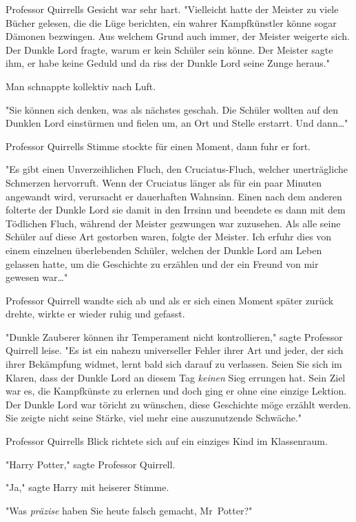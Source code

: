 {Professor Quirrells Gesicht war sehr hart. "Vielleicht hatte der Meister zu viele Bücher gelesen, die die Lüge berichten, ein wahrer Kampfkünstler könne sogar Dämonen bezwingen. Aus welchem Grund auch immer, der Meister weigerte sich. Der Dunkle Lord fragte, warum er kein Schüler sein könne. Der Meister sagte ihm, er habe keine Geduld und da riss der Dunkle Lord seine Zunge heraus."

Man schnappte kollektiv nach Luft.

"Sie können sich denken, was als nächstes geschah. Die Schüler wollten auf den Dunklen Lord einstürmen und fielen um, an Ort und Stelle erstarrt. Und dann…"

Professor Quirrells Stimme stockte für einen Moment, dann fuhr er fort.

"Es gibt einen Unverzeihlichen Fluch, den Cruciatus-Fluch, welcher unerträgliche Schmerzen hervorruft. Wenn der Cruciatus länger als für ein paar Minuten angewandt wird, verursacht er dauerhaften Wahnsinn. Einen nach dem anderen folterte der Dunkle Lord sie damit in den Irrsinn und beendete es dann mit dem Tödlichen Fluch, während der Meister gezwungen war zuzusehen. Als alle seine Schüler auf diese Art gestorben waren, folgte der Meister. Ich erfuhr dies von einem einzelnen überlebenden Schüler, welchen der Dunkle Lord am Leben gelassen hatte, um die Geschichte zu erzählen und der ein Freund von mir gewesen war…"

Professor Quirrell wandte sich ab und als er sich einen Moment später zurück drehte, wirkte er wieder ruhig und gefasst.

"Dunkle Zauberer können ihr Temperament nicht kontrollieren," sagte Professor Quirrell leise. "Es ist ein nahezu universeller Fehler ihrer Art und jeder, der sich ihrer Bekämpfung widmet, lernt bald sich darauf zu verlassen. Seien Sie sich im Klaren, dass der Dunkle Lord an diesem Tag \emph{keinen} Sieg errungen hat. Sein Ziel war es, die Kampfkünste zu erlernen und doch ging er ohne eine einzige Lektion. Der Dunkle Lord war töricht zu wünschen, diese Geschichte möge erzählt werden. Sie zeigte nicht seine Stärke, viel mehr eine auszunutzende Schwäche."

Professor Quirrells Blick richtete sich auf ein einziges Kind im Klassenraum.

"Harry Potter," sagte Professor Quirrell.

"Ja," sagte Harry mit heiserer Stimme.

"Was \emph{präzise} haben Sie heute falsch gemacht, Mr~Potter?"

}
